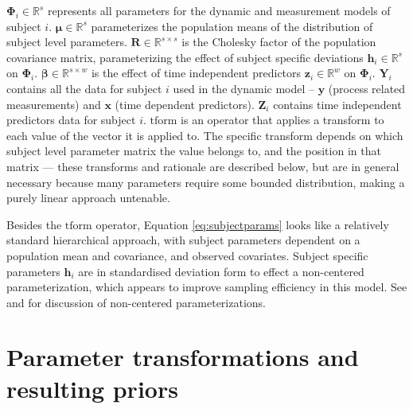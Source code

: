 \documentclass[nojss]{jss}\usepackage[]{graphicx}\usepackage[]{color}
\newcommand{\vect}[1]{\boldsymbol{\mathbf{#1}}}
\begin{document}
$\vect{\Phi}_i \in\mathbb{R}^{s}$ represents all parameters for the dynamic and measurement models of subject $i$. 
$\vect{\mu} \in\mathbb{R}^{s}$ parameterizes the population means of the distribution of subject level parameters. 
$\vect{R} \in\mathbb{R}^{s \times s}$ is the Cholesky factor of the population covariance matrix, parameterizing the effect of subject specific deviations $\vect{h}_i \in\mathbb{R}^{s}$ on $\vect{\Phi}_i$.
$\vect{\beta} \in\mathbb{R}^{s \times w}$ is the effect of time independent predictors $\vect{z}_i \in\mathbb{R}^{w}$  on $\vect{\Phi}_i$. 
$\vect{Y}_i$ contains all the data for subject $i$ used in the dynamic model -- $\vect{y}$ (process related measurements) and $\vect{x}$ (time dependent predictors).  $\vect{Z}_i$ contains time independent predictors data for subject $i$. 
$\text{tform}$ is an operator that applies a transform to each value of the vector it is applied to. The specific transform depends on which subject level parameter matrix the value belongs to, and the position in that matrix --- these transforms and rationale are described below, but are in general necessary because many parameters require some bounded distribution, making a purely linear approach untenable. 

Besides the $\text{tform}$ operator, Equation \ref{eq:subjectparams} looks like a relatively standard hierarchical approach, with subject parameters dependent on a population mean and covariance, and observed covariates. Subject specific parameters $\vect{h}_i$ are in standardised deviation form to effect a non-centered parameterization, which appears to improve sampling efficiency in this model. See \citet{bernardo2003noncentered} and \citet{betancourt2013hamiltonian} for discussion of non-centered parameterizations.

\section{Parameter transformations and resulting priors}
\label{app:transforms}
\end{document}
